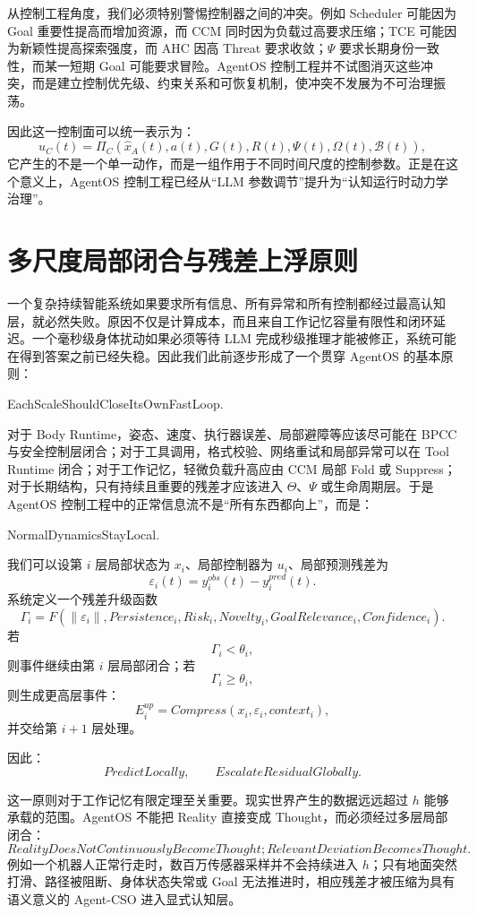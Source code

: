 从控制工程角度，我们必须特别警惕控制器之间的冲突。例如 Scheduler 可能因为 Goal 重要性提高而增加资源，而 CCM 同时因为负载过高要求压缩；TCE 可能因为新颖性提高探索强度，而 AHC 因高 Threat 要求收敛；$\Psi$ 要求长期身份一致性，而某一短期 Goal 可能要求冒险。AgentOS 控制工程并不试图消灭这些冲突，而是建立控制优先级、约束关系和可恢复机制，使冲突不发展为不可治理振荡。

因此这一控制面可以统一表示为：
\[
u_C(t)
=
\Pi_C(
\hat x_A(t),
a(t),
G(t),
R(t),
\Psi(t),
\Omega(t),
\mathcal B(t)
),
\]
它产生的不是一个单一动作，而是一组作用于不同时间尺度的控制参数。正是在这个意义上，AgentOS 控制工程已经从“LLM 参数调节”提升为“认知运行时动力学治理”。

\section{多尺度局部闭合与残差上浮原则}

一个复杂持续智能系统如果要求所有信息、所有异常和所有控制都经过最高认知层，就必然失败。原因不仅是计算成本，而且来自工作记忆容量有限性和闭环延迟。一个毫秒级身体扰动如果必须等待 LLM 完成秒级推理才能被修正，系统可能在得到答案之前已经失稳。因此我们此前逐步形成了一个贯穿 AgentOS 的基本原则：
\begin{statementbox}
EachScaleShouldCloseItsOwnFastLoop.
\end{statementbox}

对于 Body Runtime，姿态、速度、执行器误差、局部避障等应该尽可能在 BPCC 与安全控制层闭合；对于工具调用，格式校验、网络重试和局部异常可以在 Tool Runtime 闭合；对于工作记忆，轻微负载升高应由 CCM 局部 Fold 或 Suppress；对于长期结构，只有持续且重要的残差才应该进入 $\Theta$、$\Psi$ 或生命周期层。于是 AgentOS 控制工程中的正常信息流不是“所有东西都向上”，而是：
\begin{statementbox}
NormalDynamicsStayLocal.
\end{statementbox}

我们可以设第 $i$ 层局部状态为 $x_i$、局部控制器为 $u_i$、局部预测残差为
\[
\varepsilon_i(t)
=
y_i^{obs}(t)
-
y_i^{pred}(t).
\]
系统定义一个残差升级函数
\[
\Gamma_i
=
F(
\|\varepsilon_i\|,
Persistence_i,
Risk_i,
Novelty_i,
GoalRelevance_i,
Confidence_i
).
\]
若
\[
\Gamma_i<\theta_i,
\]
则事件继续由第 $i$ 层局部闭合；若
\[
\Gamma_i\ge\theta_i,
\]
则生成更高层事件：
\[
E_i^{up}
=
Compress(
x_i,\varepsilon_i,context_i
),
\]
并交给第 $i+1$ 层处理。

因此：
\[
\boxed{
PredictLocally,\qquad
EscalateResidualGlobally.
}
\]

这一原则对于工作记忆有限定理至关重要。现实世界产生的数据远远超过 $h$ 能够承载的范围。AgentOS 不能把 Reality 直接变成 Thought，而必须经过多层局部闭合：
\[
\boxed{
RealityDoesNotContinuouslyBecomeThought;
RelevantDeviationBecomesThought.
}
\]
例如一个机器人正常行走时，数百万传感器采样并不会持续进入 $h$；只有地面突然打滑、路径被阻断、身体状态失常或 Goal 无法推进时，相应残差才被压缩为具有语义意义的 Agent-CSO 进入显式认知层。

